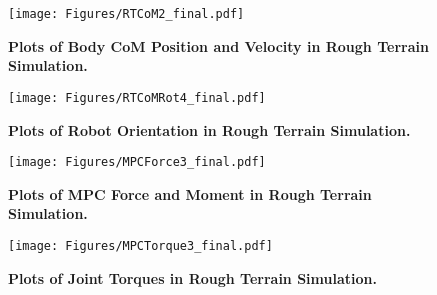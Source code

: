 \begin{figure}[h]
	\hspace{0.2cm}
	\center
	\texttt{[image: Figures/RTCoM2\_final.pdf]}
	\caption{{\bfseries Plots of Body CoM Position and Velocity in Rough Terrain Simulation.}  }
	\label{fig:CoMposVel}
\end{figure}
\begin{figure}[h]
	\center
	\texttt{[image: Figures/RTCoMRot4\_final.pdf]}
	\caption{{\bfseries Plots of Robot Orientation in Rough Terrain Simulation. }  }
	\label{fig:CoMeulAng}
\end{figure}
\begin{figure}[!h]
	\center
	\texttt{[image: Figures/MPCForce3\_final.pdf]}
	\caption{{\bfseries Plots of MPC Force and Moment in Rough Terrain Simulation.  }}
	\label{fig:MPCforce}
\end{figure}
\begin{figure}%
	\hspace{0.2cm}
	\center
	\texttt{[image: Figures/MPCTorque3\_final.pdf]}
	\caption{{\bfseries Plots of Joint Torques in Rough Terrain Simulation.  } }
	\label{fig:MPCtauRT}
\end{figure}

